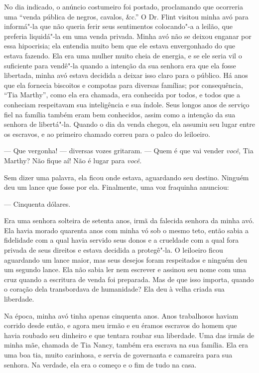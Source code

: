 No dia indicado, o anúncio costumeiro
foi postado, proclamando que ocorreria uma ``venda pública de negros,
cavalos, \&c.'' O Dr. Flint visitou minha avó para informá"-la que não
queria ferir seus sentimentos colocando"-a a leilão, que preferia
liquidá"-la em uma venda privada. Minha avó não se deixou enganar por
essa hipocrisia; ela entendia muito bem que ele estava envergonhado do
que estava fazendo. Ela era uma mulher muito cheia de energia, e se ele
seria vil o suficiente para vendê"-la quando a intenção da sua senhora
era que ela fosse libertada, minha avó estava decidida a deixar isso
claro para o público. Há anos que ela fornecia biscoitos e compotas para
diversas famílias; por consequência, ``Tia Marthy'', como ela era
chamada, era conhecida por todos, e todos que a conheciam respeitavam
sua inteligência e sua índole. Seus longos anos de serviço fiel na
família também eram bem conhecidos, assim como a intenção da sua senhora
de libertá"-la. Quando o dia da venda chegou, ela assumiu seu lugar entre
os escravos, e ao primeiro chamado correu para o palco do leiloeiro.

--- Que vergonha! --- diversas vozes gritaram. --- Quem é que vai vender
\emph{você}, Tia Marthy? Não fique aí! Não é lugar para \emph{você}.

Sem dizer uma palavra, ela ficou onde estava, aguardando seu destino.
Ninguém deu um lance que fosse por ela. Finalmente, uma voz fraquinha
anunciou:

--- Cinquenta dólares.

Era uma senhora solteira de setenta anos, irmã da falecida senhora da
minha avó. Ela havia morado quarenta anos com minha vó sob o mesmo teto,
então sabia a fidelidade com a qual havia servido seus donos e a
crueldade com a qual fora privada de seus direitos e estava decidida a
protegê"-la. O leiloeiro ficou aguardando um lance maior, mas seus
desejos foram respeitados e ninguém deu um segundo lance. Ela não sabia
ler nem escrever e assinou seu nome com uma cruz quando a escritura de
venda foi preparada. Mas de que isso importa, quando o coração dela
transbordava de humanidade? Ela deu à velha criada sua liberdade.

Na época, minha avó tinha apenas
cinquenta anos. Anos trabalhosos haviam corrido desde então, e agora meu
irmão e eu éramos escravos do homem que havia roubado seu dinheiro e que
tentara roubar sua liberdade. Uma das irmãs de minha mãe, chamada de Tia
Nancy, também era escrava na sua família. Ela era uma boa tia, muito
carinhosa, e servia de governanta e camareira para sua senhora. Na
verdade, ela era o começo e o fim de tudo na casa.


